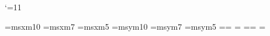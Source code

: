 %

\catcode`\@=11

\font\tenmsx=msxm10
\font\sevenmsx=msxm7
\font\fivemsx=msxm5
\font\tenmsy=msym10
\font\sevenmsy=msym7
\font\fivemsy=msym5
\newfam\msxfam
\newfam\msyfam
\textfont\msxfam=\tenmsx  \scriptfont\msxfam=\sevenmsx
  \scriptscriptfont\msxfam=\fivemsx
\textfont\msyfam=\tenmsy  \scriptfont\msyfam=\sevenmsy
  \scriptscriptfont\msyfam=\fivemsy

\def\hexnumber@#1{\ifcase#1 0\or1\or2\or3\or4\or5\or6\or7\or8\or9\or
	A\or B\or C\or D\or E\or F\fi }


\edef\msx@{\hexnumber@\msxfam}
\edef\msy@{\hexnumber@\msyfam}

